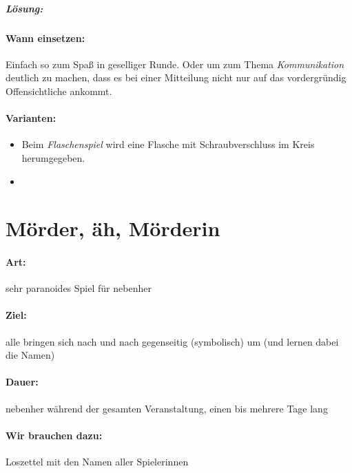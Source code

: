 \subparagraph{Lösung:}
\vspace{.5em}

\paragraph{Wann einsetzen:} Einfach so zum Spaß in geselliger Runde. Oder um zum Thema \emph{Kommunikation} deutlich zu machen, dass es bei einer Mitteilung nicht nur auf das vordergründig Offensichtliche ankommt.
\paragraph{Varianten:}
\begin{itemize}
  \item Beim \emph{Flaschenspiel} wird eine Flasche mit Schraubverschluss im Kreis herumgegeben.
  \item
\end{itemize}

\section{Mörder, äh, Mörderin}
\paragraph{Art:} sehr paranoides Spiel für nebenher
\paragraph{Ziel:} alle bringen sich nach und nach gegenseitig (symbolisch) um (und lernen dabei die Namen)
\paragraph{Dauer:} nebenher während der gesamten Veranstaltung, einen bis mehrere Tage lang
\paragraph{Wir brauchen dazu:} Loszettel mit den Namen aller Spielerinnen
